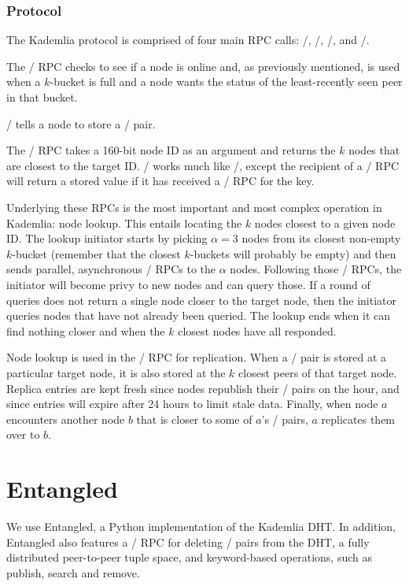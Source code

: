 \documentclass[12pt,twocolumn]{article}
\begin{document}
\subsubsection{Protocol}

The Kademlia protocol is comprised of four main RPC calls: \ping/, \store/, \findNode/, and \findValue/.

The \ping/ RPC checks to see if a node is online and, as previously mentioned, is used when a $k$-bucket is full and a node wants the status of the least-recently seen peer in that bucket.

\store/ tells a node to store a \kv/ pair.

The \findNode/ RPC takes a 160-bit node ID as an argument and returns the $k$ nodes that are closest to the target ID. \findValue/ works much like \findNode/, except the recipient of a \findValue/ RPC will return a stored value if it has received a \store/ RPC for the key.

Underlying these RPCs is the most important and most complex operation in Kademlia: node lookup. This entails locating the $k$ nodes closest to a given node ID. The lookup initiator starts by picking $\alpha = 3$ nodes from its closest non-empty $k$-bucket (remember that the closest $k$-buckets will probably be empty) and then sends parallel, asynchronous \findNode/ RPCs to the $\alpha$ nodes. Following those \findNode/ RPCs, the initiator will become privy to new nodes and can query those. If a round of queries does not return a single node closer to the target node, then the initiator queries nodes that have not already been queried. The lookup ends when it can find nothing closer and when the $k$ closest nodes have all responded.

Node lookup is used in the \store/ RPC for replication. When a \kv/ pair is stored at a particular target node, it is also stored at the $k$ closest peers of that target node. Replica entries are kept fresh since nodes republish their \kv/ pairs on the hour, and since entries will expire after 24 hours to limit stale data. Finally, when node $a$ encounters another node $b$ that is closer to some of $a$'s \kv/ pairs, $a$ replicates them over to $b$.

\section{Entangled}

We use Entangled, a Python implementation of the Kademlia DHT.
In addition, Entangled also features a \delete/ RPC for deleting \kv/ pairs from the DHT, a fully distributed peer-to-peer tuple space, and keyword-based operations, such as publish, search and remove.
\end{document}
